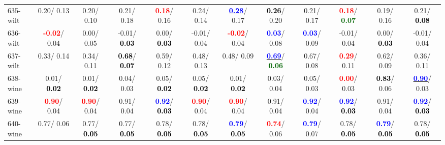 \begin{table}[h]
\begin{center}
{\begin{tabular}{lc|c|c|c|c|c|c|c|c|c|c}
635-wilt &   0.20/  0.13 &   0.20/  0.10 &   0.21/  0.18 & \textcolor{red}{\textbf{  0.18}}/  0.16 &   0.24/  0.14 & \underline{\textcolor{blue}{\textbf{  0.28}}}/  0.17 & \textcolor{black}{\textbf{  0.26}}/  0.20 &   0.21/  0.17 & \textcolor{red}{\textbf{  0.18}}/\textcolor{darkgreen}{\textbf{  0.07}} &   0.19/  0.16 &   0.21/\textcolor{black}{\textbf{  0.08}} \\
636-wilt & \textcolor{red}{\textbf{ -0.02}}/  0.04 &   0.00/  0.05 &  -0.01/\textcolor{black}{\textbf{  0.03}} &   0.00/\textcolor{black}{\textbf{  0.03}} &  -0.01/  0.04 & \textcolor{red}{\textbf{ -0.02}}/  0.04 & \textcolor{blue}{\textbf{  0.03}}/  0.08 & \textcolor{blue}{\textbf{  0.03}}/  0.09 &  -0.01/  0.04 &   0.00/\textcolor{black}{\textbf{  0.03}} &  -0.01/  0.04 \\ \hline
637-wilt &   0.33/  0.14 &   0.34/  0.11 & \textcolor{black}{\textbf{  0.68}}/\textcolor{black}{\textbf{  0.07}} &   0.59/  0.12 &   0.48/  0.13 &   0.48/  0.09 & \underline{\textcolor{blue}{\textbf{  0.69}}}/\textcolor{darkgreen}{\textbf{  0.06}} &   0.67/  0.08 & \textcolor{red}{\textbf{  0.29}}/  0.11 &   0.62/  0.09 &   0.36/  0.11 \\
638-wine &   0.01/\textcolor{black}{\textbf{  0.02}} &   0.01/\textcolor{black}{\textbf{  0.02}} &   0.04/  0.03 &   0.05/\textcolor{black}{\textbf{  0.02}} &   0.05/\textcolor{black}{\textbf{  0.02}} &   0.01/\textcolor{black}{\textbf{  0.02}} &   0.03/  0.04 &   0.05/  0.03 & \textcolor{red}{\textbf{  0.00}}/  0.03 & \textcolor{black}{\textbf{  0.83}}/  0.06 & \underline{\textcolor{blue}{\textbf{  0.90}}}/  0.03 \\
639-wine & \textcolor{red}{\textbf{  0.90}}/  0.04 & \textcolor{red}{\textbf{  0.90}}/  0.04 &   0.91/  0.04 & \textcolor{blue}{\textbf{  0.92}}/\textcolor{black}{\textbf{  0.03}} & \textcolor{red}{\textbf{  0.90}}/  0.04 & \textcolor{red}{\textbf{  0.90}}/  0.04 &   0.91/  0.04 & \textcolor{blue}{\textbf{  0.92}}/  0.04 & \textcolor{blue}{\textbf{  0.92}}/\textcolor{black}{\textbf{  0.03}} &   0.91/  0.04 & \textcolor{blue}{\textbf{  0.92}}/\textcolor{black}{\textbf{  0.03}} \\
640-wine &   0.77/  0.06 &   0.77/\textcolor{black}{\textbf{  0.05}} &   0.77/\textcolor{black}{\textbf{  0.05}} &   0.78/\textcolor{black}{\textbf{  0.05}} &   0.78/\textcolor{black}{\textbf{  0.05}} & \textcolor{blue}{\textbf{  0.79}}/\textcolor{black}{\textbf{  0.05}} & \textcolor{red}{\textbf{  0.74}}/  0.06 & \textcolor{blue}{\textbf{  0.79}}/  0.07 &   0.78/\textcolor{black}{\textbf{  0.05}} & \textcolor{blue}{\textbf{  0.79}}/\textcolor{black}{\textbf{  0.05}} &   0.78/\textcolor{black}{\textbf{  0.05}} \\\end{tabular}}\label{stratsALCKappa19AllReduxa}
\end{center}
\end{table}
